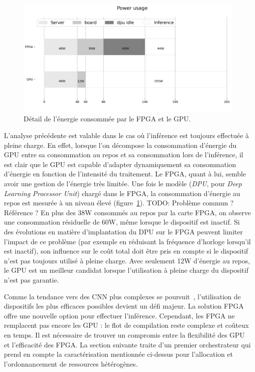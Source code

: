 \begin{figure}[!ht]
    \centering
    \includegraphics[width=\columnwidth]{4_Chapitre4/figures/characterization/power_usage.png}
    \caption{Détail de l'énergie consommée par le FPGA et le GPU.}
    \label{figure:herofake-power-usage}
\end{figure}

L'analyse précédente est valable dans le cas où l'inférence est toujours effectuée à pleine charge. En effet, lorsque l'on décompose la consommation d'énergie du GPU entre sa consommation au repos et sa consommation lors de l'inférence, il est clair que le GPU est capable d'adapter dynamiquement sa consommation d'énergie en fonction de l'intensité du traitement. Le FPGA, quant à lui, semble avoir une gestion de l'énergie très limitée. Une fois le modèle (\textit{DPU}, pour \textit{Deep Learning Processor Unit}) chargé dans le FPGA, la consommation d'énergie au repos est mesurée à un niveau élevé (figure~\ref{figure:herofake-power-usage}).
TODO: Problème commun ? Référence ?
En plus des 38W consommés au repos par la carte FPGA, on observe une consommation résiduelle de 60W, même lorsque le dispositif est inactif. Si des évolutions en matière d'implantation du DPU sur le FPGA peuvent limiter l'impact de ce problème (par exemple en réduisant la fréquence d'horloge lorsqu'il est inactif), son influence sur le coût total doit être pris en compte si le dispositif n'est pas toujours utilisé à pleine charge. Avec seulement 12W d'énergie au repos, le GPU est un meilleur candidat lorsque l'utilisation à pleine charge du dispositif n'est pas garantie.

Comme la tendance vers des CNN plus complexes se poursuit~\cite{8807741}, l'utilisation de dispositifs les plus efficaces possibles devient un défi majeur. La solution FPGA offre une nouvelle option pour effectuer l'inférence. Cependant, les FPGA ne remplacent pas encore les GPU : le flot de compilation reste complexe et coûteux en temps. Il est nécessaire de trouver un compromis entre la flexibilité des GPU et l'efficacité des FPGA. La section suivante traite d'un premier orchestrateur qui prend en compte la caractérisation mentionnée ci-dessus pour l'allocation et l'ordonnancement de ressources hétérogènes.

